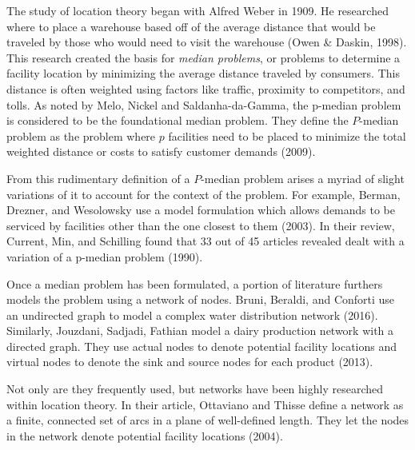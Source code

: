 \documentclass[twoside,twocolumn]{article}
\begin{document}
The study of location theory began with Alfred Weber in 1909.
He researched where to place a warehouse based off of the average distance that would be traveled by those who would need to visit the warehouse (Owen \& Daskin, 1998).
This research created the basis for {\em median problems}, or problems to determine a facility location by minimizing the average distance traveled by consumers. 
This distance is often weighted using factors like traffic, proximity to competitors, and tolls.
As noted by Melo, Nickel and Saldanha-da-Gamma, the p-median problem is considered to be the foundational median problem.
They define the $P$-median problem as the problem where $p$ facilities need to be placed to minimize the total weighted distance or costs to satisfy customer demands (2009).

From this rudimentary definition of a $P$-median problem arises a myriad of slight variations of it to account for the context of the problem. 
For example, Berman, Drezner, and Wesolowsky use a model formulation which allows demands to be serviced by facilities other than the one closest to them (2003). %
In their review, Current, Min, and Schilling found that 33 out of 45 articles revealed dealt with a variation of a p-median problem (1990).

Once a median problem has been formulated, a portion of literature furthers models the problem using a network of nodes.
Bruni, Beraldi, and Conforti use an undirected graph to model a complex water distribution network (2016).
Similarly, Jouzdani, Sadjadi, Fathian model a dairy production network with a directed graph.
They use actual nodes to denote potential facility locations and virtual nodes to denote the sink and source nodes for each product (2013).

Not only are they frequently used, but networks have been highly researched within location theory.
In their article, Ottaviano and Thisse define a network as a finite, connected set of arcs in a plane of well-defined length.
They let the nodes in the network denote potential facility locations (2004). %
\end{document}
